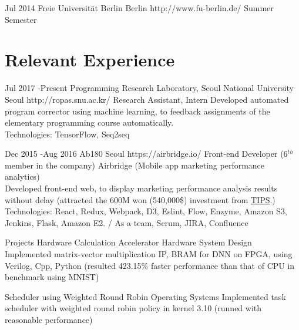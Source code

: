 \documentclass[10pt]{article} %
\begin{document}

\if{}
\job
{Jul 2014}{}
{Freie Universität Berlin}
{Berlin}
{http://www.fu-berlin.de/}
{Summer Semester}

\fi


\section{Relevant Experience}

\job
{Jul 2017 -}{Present}
{Programming Research Laboratory, Seoul National University}
{Seoul}
{http://ropas.snu.ac.kr/}
{Research Assistant, Intern}
{Developed automated program corrector using machine learning, to feedback assignments of the elementary programming course automatically.\\
Technologies: TensorFlow, Seq2seq}


\job
{Dec 2015 -}{Aug 2016}
{Ab180}
{Seoul}
{https://airbridge.io/}
{Front-end Developer (6$^{th}$ member in the company)}
{Airbridge (Mobile app marketing performance analytics)\\
Developed front-end web, to display marketing performance analysis results without delay (attracted the 600M won (540,000\$) investment from \href{http://www.jointips.or.kr/}{TIPS}.)\\
Technologies: React, Redux, Webpack, D3, Eslint, Flow, Enzyme, Amazon S3, Jenkins, Flask, Amazon E2. / As a team, Scrum, JIRA, Confluence}


\project
{Projects}
{Hardware Calculation Accelerator}
{Hardware System Design}
{Implemented matrix-vector multiplication IP, BRAM for DNN on FPGA, using Verilog, Cpp, Python (resulted 423.15\% faster performance than that of CPU in benchmark using MNIST)}

\project
{}
{Scheduler using Weighted Round Robin}
{Operating Systems}
{Implemented task scheduler with weighted round robin policy in kernel 3.10 (runned with reasonable performance)}
\end{document}
